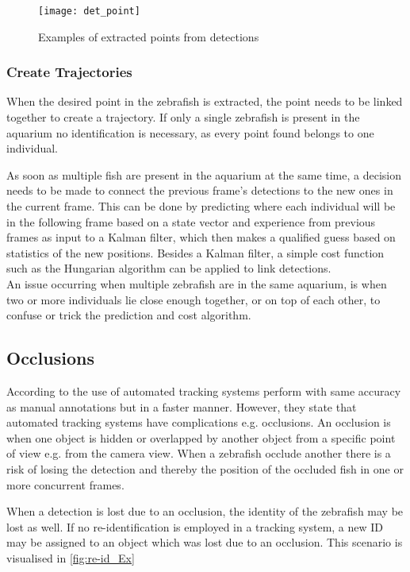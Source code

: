 \begin{figure}[H]
	\centering
	\texttt{[image: det\_point]}
	\caption{Examples of extracted points from detections}
	\label{fig:det_point}
\end{figure}

\subsubsection{Create Trajectories}
When the desired point in the zebrafish is extracted, the point needs to be linked together to create a trajectory. If only a single zebrafish is present in the aquarium no identification is necessary, as every point found belongs to one individual.

As soon as multiple fish are present in the aquarium at the same time, a decision needs to be made to connect the previous frame's detections to the new ones in the current frame. This can be done by predicting where each individual will be in the following frame based on a state vector and experience from previous frames as input to a Kalman filter, which then makes a qualified guess based on statistics of the new positions. Besides a Kalman filter, a simple cost function such as the Hungarian algorithm can be applied to link detections.\\

An issue occurring when multiple zebrafish are in the same aquarium, is when two or more individuals lie close enough together, or on top of each other, to confuse or trick the prediction and cost algorithm.

\subsection{Occlusions}
According to  \cite{Green2012} the use of automated tracking systems perform with same accuracy as manual annotations but in a faster manner. However, they state that automated tracking systems have complications e.g. occlusions. An occlusion is when one object is hidden or overlapped by another object from a specific point of view e.g. from the camera view. When a zebrafish occlude another there is a risk of losing the detection and thereby the position of the occluded fish in one or more concurrent frames.

When a detection is lost due to an occlusion, the identity of the zebrafish may be lost as well. If no re-identification is employed in a tracking system, a new ID may be assigned to an object which was lost due to an occlusion. This scenario is visualised in \autoref{fig:re-id_Ex}


